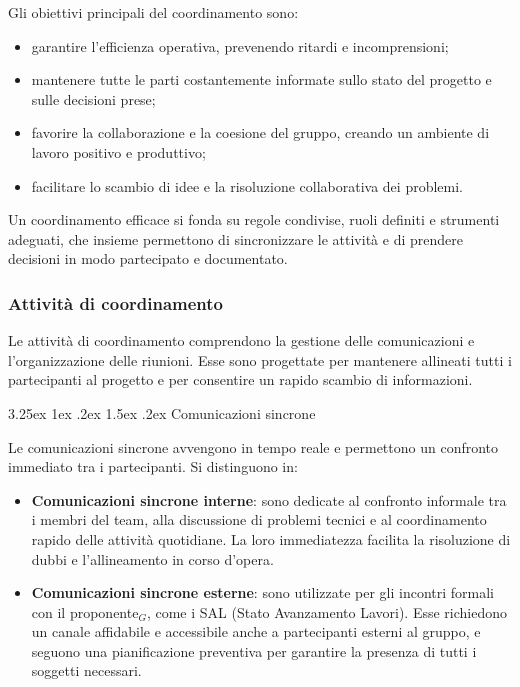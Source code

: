 \documentclass[a4paper, 10pt]{article}
\makeatletter
\renewcommand\paragraph{\@startsection{paragraph}{4}{\z@}%
  {3.25ex \@plus1ex \@minus .2ex}%
  {1.5ex \@plus .2ex}%
  {\normalfont\normalsize\bfseries}}
\makeatother
\begin{document}
Gli obiettivi principali del coordinamento sono:
\begin{itemize}
    \item garantire l'efficienza operativa, prevenendo ritardi e incomprensioni;
    \item mantenere tutte le parti costantemente informate sullo stato del progetto e sulle decisioni prese;
    \item favorire la collaborazione e la coesione del gruppo, creando un ambiente di lavoro positivo e produttivo;
    \item facilitare lo scambio di idee e la risoluzione collaborativa dei problemi.
\end{itemize}

Un coordinamento efficace si fonda su regole condivise, ruoli definiti e strumenti adeguati, che insieme permettono di sincronizzare le attività e di prendere decisioni in modo partecipato e documentato.

\subsubsection{Attività di coordinamento}
\label{subsubsec:attivita_coordinamento}

Le attività di coordinamento comprendono la gestione delle comunicazioni e l'organizzazione delle riunioni. Esse sono progettate per mantenere allineati tutti i partecipanti al progetto e per consentire un rapido scambio di informazioni.

\paragraph{Comunicazioni sincrone}

Le comunicazioni sincrone avvengono in tempo reale e permettono un confronto immediato tra i partecipanti. Si distinguono in:
\begin{itemize}
    \item \textbf{Comunicazioni sincrone interne}: sono dedicate al confronto informale tra i membri del team, alla discussione di problemi tecnici e al coordinamento rapido delle attività quotidiane. La loro immediatezza facilita la risoluzione di dubbi e l'allineamento in corso d'opera.
    \item \textbf{Comunicazioni sincrone esterne}: sono utilizzate per gli incontri formali con il proponente$_G$, come i SAL (Stato Avanzamento Lavori). Esse richiedono un canale affidabile e accessibile anche a partecipanti esterni al gruppo, e seguono una pianificazione preventiva per garantire la presenza di tutti i soggetti necessari.
\end{itemize}
\end{document}
